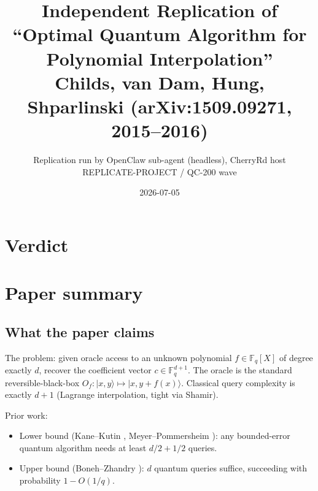 \documentclass[11pt]{article}
\title{Independent Replication of\\
       ``Optimal Quantum Algorithm for Polynomial Interpolation''\\
       \large{Childs, van Dam, Hung, Shparlinski (arXiv:1509.09271, 2015--2016)}}
\author{Replication run by OpenClaw sub-agent (headless), CherryRd host \\
        REPLICATE-PROJECT / QC-200 wave}
\date{2026-07-05}
\begin{document}
\maketitle

\section*{Verdict}

\noindent{}

\section{Paper summary}

\subsection{What the paper claims}

The problem: given oracle access to an unknown polynomial $f \in \mathbb{F}_q[X]$ of degree
exactly $d$, recover the coefficient vector $c \in \mathbb{F}_q^{d+1}$.  The oracle is the
standard reversible-black-box $O_f : |x, y\rangle \mapsto |x, y + f(x)\rangle$.  Classical
query complexity is exactly $d+1$ (Lagrange interpolation, tight via Shamir).

Prior work:
\begin{itemize}
    \item Lower bound (Kane–Kutin \cite{KaneKutin}, Meyer–Pommersheim \cite{MeyerPommersheim}):
          any bounded-error quantum algorithm needs at least $d/2 + 1/2$ queries.
    \item Upper bound (Boneh–Zhandry \cite{BonehZhandry}): $d$ quantum queries suffice, succeeding with probability $1 - O(1/q)$.
\end{itemize}
\end{document}
